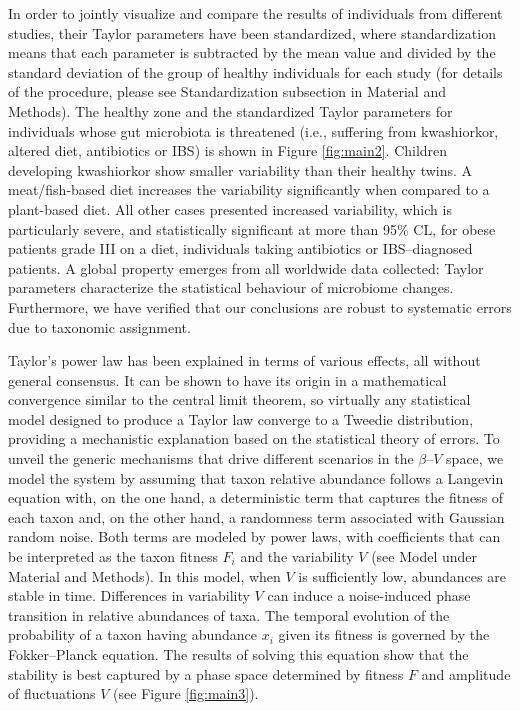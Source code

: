 In order to jointly visualize and compare the results of individuals from different studies, their Taylor parameters have been standardized, where standardization means that each parameter is subtracted by the mean value and divided by the standard deviation of the group of healthy individuals for each study (for details of the procedure, please see Standardization subsection in Material and Methods). The healthy zone and the standardized Taylor parameters for individuals whose gut microbiota is threatened (i.e., suffering from kwashiorkor, altered diet, antibiotics or IBS) is shown in Figure \ref{fig:main2}. Children developing kwashiorkor show smaller variability than their healthy twins. A meat/fish-based diet increases the variability significantly when compared to a plant-based diet. All other cases presented increased variability, which is particularly severe, and statistically significant at more than 95\% CL, for obese patients grade III on a diet, individuals taking antibiotics or IBS--diagnosed patients. A global property emerges from all worldwide data collected: Taylor parameters characterize the statistical behaviour of microbiome changes. Furthermore, we have verified that our conclusions are robust to systematic errors due to taxonomic assignment.

Taylor's power law has been explained in terms of various effects, all without general consensus. It can be shown to have its origin in a mathematical convergence similar to the central limit theorem, so virtually any statistical model designed to produce a Taylor law converge to a Tweedie distribution\cite{stat}, providing a mechanistic explanation based on the statistical theory of errors\cite{convergence1,convergence2,convergence3}. To unveil the generic mechanisms that drive different scenarios in the $\beta$--$V$ space, we model the system by assuming that taxon relative abundance follows a Langevin equation with, on the one hand, a deterministic term that captures the fitness of each taxon and, on the other hand, a randomness term associated with Gaussian random noise\cite{ranking}. Both terms are modeled by power laws, with coefficients that can be interpreted as the taxon fitness $F_i$ and the variability $V$ (see Model under Material and Methods). In this model, when $V$ is sufficiently low, abundances are stable in time. Differences in variability $V$ can induce a noise-induced phase transition in relative abundances of taxa. The temporal evolution of the probability of a taxon having abundance $x_i$ given its fitness is governed by the Fokker--Planck equation. The results of solving this equation show that the stability is best captured by a phase space determined by fitness $F$ and amplitude of fluctuations $V$ (see Figure \ref{fig:main3}). 

